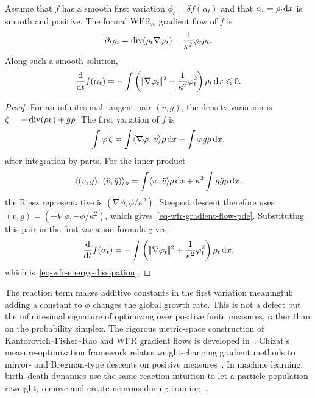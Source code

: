 \begin{proposition}\label{prop-wfr-gradient-flow-pde}
	Assume that $f$ has a smooth first variation \(\phi_t=\delta f(\alpha_t)\) and that $\alpha_t=\rho_t\mathrm{d} x$ is smooth and positive. The formal $\operatorname{WFR}_\kappa$ gradient flow of $f$ is
	\begin{equation}\label{eq-wfr-gradient-flow-pde}
		\partial_t\rho_t
		=
		\operatorname{div}(\rho_t\nabla\varphi_t)
		-
		\frac{1}{\kappa^2}\varphi_t\rho_t.
	\end{equation}
	Along such a smooth solution,
	\begin{equation}\label{eq-wfr-energy-dissipation}
		\frac{\mathrm{d}}{\mathrm{d} t}f(\alpha_t)
		=
		-\int
		\left(|\!| \nabla\varphi_t |\!|^2+\frac{1}{\kappa^2}\varphi_t^2\right)\rho_t\,\mathrm{d} x
		\leqslant 0.
	\end{equation}
\end{proposition}
\begin{proof}
	For an infinitesimal tangent pair $(v,g)$, the density variation is $\zeta=-\operatorname{div}(\rho v)+g\rho$. The first variation of $f$ is
	\[
		\int \varphi\,\zeta
		=
		\int \langle \nabla\varphi,\,v\rangle\rho\,\mathrm{d} x+\int \varphi g\rho\,\mathrm{d} x,
	\]
	after integration by parts. For the inner product
	\[
		\langle (v,g),\,(\tilde v,\tilde g)\rangle_\rho
		=
		\int \langle v,\,\tilde v\rangle\rho\,\mathrm{d} x+\kappa^2\int g\tilde g\rho\,\mathrm{d} x,
	\]
	the Riesz representative is $(\nabla\phi,\phi/\kappa^2)$. Steepest descent therefore uses $(v,g)=(-\nabla\phi,-\phi/\kappa^2)$, which gives~\eqref{eq-wfr-gradient-flow-pde}.
	Substituting this pair in the first-variation formula gives
	\[
		\frac{\mathrm{d}}{\mathrm{d} t}f(\alpha_t)
		=
		-\int
		\left(|\!| \nabla\varphi_t |\!|^2+\frac{1}{\kappa^2}\varphi_t^2\right)\rho_t\,\mathrm{d} x,
	\]
	which is~\eqref{eq-wfr-energy-dissipation}.
\end{proof}

The reaction term makes additive constants in the first variation meaningful: adding a constant to $\phi$ changes the global growth rate. This is not a defect but the infinitesimal signature of optimizing over positive finite measures, rather than on the probability simplex. The rigorous metric-space construction of Kantorovich--Fisher--Rao and WFR gradient flows is developed in~\cite{gallouet2017jko,2017-chizat-focm,2015-chizat-unbalanced}. Chizat's measure-optimization framework relates weight-changing gradient methods to mirror- and Bregman-type descents on positive measures~\cite{Chizat2019SparseOptimization,Chizat2021GradientMethodsMeasures}. In machine learning, birth--death dynamics use the same reaction intuition to let a particle population reweight, remove and create neurons during training~\cite{Rotskoff2019BirthDeath}.

